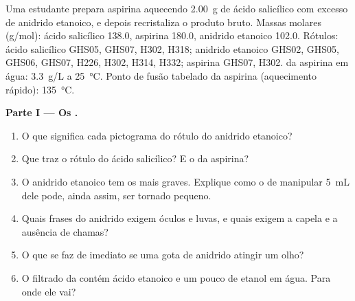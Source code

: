 \begin{problem}
\label{pb:b1:lab-techniques-1:1}
Uma estudante prepara aspirina aquecendo \qty{2.00}{g} de ácido
salicílico com excesso de anidrido etanoico, e depois recristaliza o
produto bruto. Massas molares (\unit{g/mol}): ácido salicílico  138.0, aspirina
 180.0, anidrido etanoico  102.0. Rótulos:
ácido salicílico GHS05, GHS07, H302, H318; anidrido etanoico GHS02,
GHS05, GHS06, GHS07, H226, H302, H314, H332; aspirina GHS07, H302.
 da aspirina em água: \qty{3.3}{g/L} a \qty{25}{\celsius}.
Ponto de fusão tabelado da aspirina (aquecimento rápido): \qty{135}{\celsius}.

\medskip
\noindent\textbf{Parte I --- Os .}
\begin{enumerate}
  \item O que significa cada pictograma do rótulo do anidrido etanoico?
  \item Que  traz o rótulo do ácido salicílico? E o
        da aspirina?
  \item O anidrido etanoico tem os  mais graves. Explique como o
         de manipular \qty{5}{mL} dele pode, ainda assim, ser tornado pequeno.
  \item Quais frases do anidrido exigem óculos e luvas, e quais exigem a
        capela e a ausência de chamas?
  \item O que se faz de imediato se uma gota de anidrido atingir um olho?
  \item O filtrado da  contém ácido etanoico e um pouco de
        etanol em água. Para onde ele vai?
\end{enumerate}


\end{problem}
